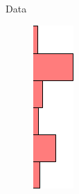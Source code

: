 \documentclass{beamer}
\begin{document}
\begin{frame}{Data}
\begin{minipage}[t]{0.45\linewidth}
\end{minipage}
\hspace{-0.65cm}
\begin{minipage}[t]{0.02\columnwidth}
	\vspace{0.78cm}
	\begin{figure}[h]
		\centering
		\includegraphics[width=2.3\linewidth]{hist1.png}

\end{figure}
\end{minipage}
\end{frame}
\end{document}
